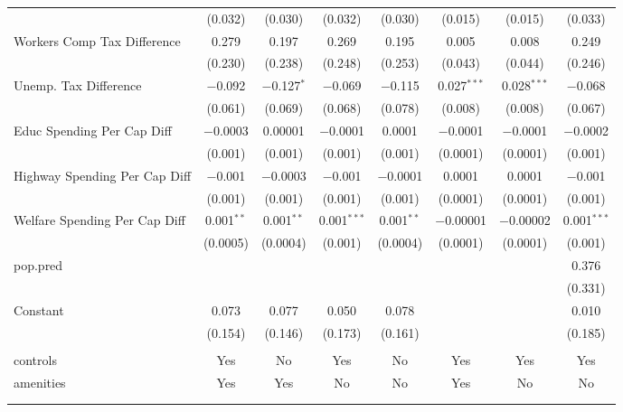 \begin{table}[!htbp]
\begin{tabular}{@{\extracolsep{5pt}}lccccccc}
  & (0.032) & (0.030) & (0.032) & (0.030) & (0.015) & (0.015) & (0.033) \\ 
  Workers Comp Tax Difference & 0.279 & 0.197 & 0.269 & 0.195 & 0.005 & 0.008 & 0.249 \\ 
  & (0.230) & (0.238) & (0.248) & (0.253) & (0.043) & (0.044) & (0.246) \\ 
  Unemp. Tax Difference & $-$0.092 & $-$0.127$^{*}$ & $-$0.069 & $-$0.115 & 0.027$^{***}$ & 0.028$^{***}$ & $-$0.068 \\ 
  & (0.061) & (0.069) & (0.068) & (0.078) & (0.008) & (0.008) & (0.067) \\ 
  Educ Spending Per Cap Diff & $-$0.0003 & 0.00001 & $-$0.0001 & 0.0001 & $-$0.0001 & $-$0.0001 & $-$0.0002 \\ 
  & (0.001) & (0.001) & (0.001) & (0.001) & (0.0001) & (0.0001) & (0.001) \\ 
  Highway Spending Per Cap Diff & $-$0.001 & $-$0.0003 & $-$0.001 & $-$0.0001 & 0.0001 & 0.0001 & $-$0.001 \\ 
  & (0.001) & (0.001) & (0.001) & (0.001) & (0.0001) & (0.0001) & (0.001) \\ 
  Welfare Spending Per Cap Diff & 0.001$^{**}$ & 0.001$^{**}$ & 0.001$^{***}$ & 0.001$^{**}$ & $-$0.00001 & $-$0.00002 & 0.001$^{***}$ \\ 
  & (0.0005) & (0.0004) & (0.001) & (0.0004) & (0.0001) & (0.0001) & (0.001) \\ 
  pop.pred &  &  &  &  &  &  & 0.376 \\ 
  &  &  &  &  &  &  & (0.331) \\ 
  Constant & 0.073 & 0.077 & 0.050 & 0.078 &  &  & 0.010 \\ 
  & (0.154) & (0.146) & (0.173) & (0.161) &  &  & (0.185) \\ 
 \hline \\[-1.8ex] 
controls & Yes & No & Yes & No & Yes & Yes & Yes \\ 
amenities & Yes & Yes & No & No & Yes & No & No \\ 
\hline \\[-1.8ex] 
\hline 
\hline \\[-1.8ex] 
\end{tabular} 
\end{table} 
